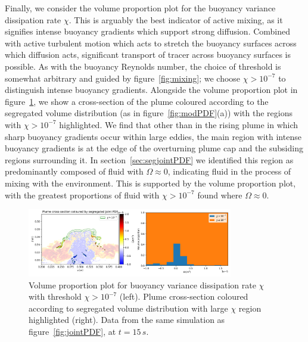 \documentclass[a4paper]{article}
\begin{document}
Finally, we consider the volume proportion plot for the buoyancy variance dissipation rate $\chi$. This is
arguably the best indicator of active mixing, as it signifies intense buoyancy gradients which support strong
diffusion. Combined with active turbulent motion which acts to stretch the buoyancy surfaces across which
diffusion acts, significant transport of tracer across buoyancy surfaces is possible. As with the buoyancy
Reynolds number, the choice of threshold is somewhat arbitrary and guided by figure~\ref{fig:mixing}; we
choose $\chi > 10^{-7}$ to distinguish intense buoyancy gradients. Alongside the volume proportion plot in
figure~\ref{fig:chi_vol}, we show a cross-section of the plume coloured according to the segregated volume
distribution (as in figure~\ref{fig:modPDF}(a)) with the regions with $\chi > 10^{-7}$ highlighted. We find
that other than in the rising plume in which sharp buoyancy gradients occur within large eddies, the main
region with intense buoyancy gradients is at the edge of the overturning plume cap and the subsiding regions
surrounding it. In section~\ref{sec:segjointPDF} we identified this region as predominantly composed of fluid
with $\Omega \approx 0$, indicating fluid in the process of mixing with the environment. This is supported by
the volume proportion plot, with the greatest proportions of fluid with $\chi > 10^{-7}$ found where $\Omega
\approx 0$.

\begin{figure}
	\centering
	\includegraphics[width=0.8\textwidth]{chi_vol}
	\caption{Volume proportion plot for buoyancy variance dissipation rate $\chi$ with threshold $\chi >
		10^{-7}$ (left). Plume cross-section coloured according to segregated volume distribution with large
		$\chi$ region highlighted (right). Data from the same simulation as figure~\ref{fig:jointPDF}, at $t =
	15\,s$.}
	\label{fig:chi_vol}
\end{figure}
\end{document}
